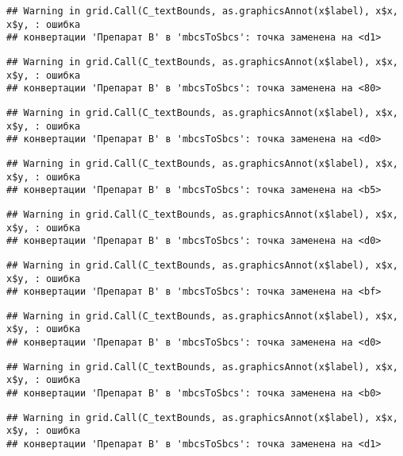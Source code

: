 \documentclass[
]{article}
\begin{document}
\begin{verbatim}
## Warning in grid.Call(C_textBounds, as.graphicsAnnot(x$label), x$x, x$y, : ошибка
## конвертации 'Препарат B' в 'mbcsToSbcs': точка заменена на <d1>
\end{verbatim}

\begin{verbatim}
## Warning in grid.Call(C_textBounds, as.graphicsAnnot(x$label), x$x, x$y, : ошибка
## конвертации 'Препарат B' в 'mbcsToSbcs': точка заменена на <80>
\end{verbatim}

\begin{verbatim}
## Warning in grid.Call(C_textBounds, as.graphicsAnnot(x$label), x$x, x$y, : ошибка
## конвертации 'Препарат B' в 'mbcsToSbcs': точка заменена на <d0>
\end{verbatim}

\begin{verbatim}
## Warning in grid.Call(C_textBounds, as.graphicsAnnot(x$label), x$x, x$y, : ошибка
## конвертации 'Препарат B' в 'mbcsToSbcs': точка заменена на <b5>
\end{verbatim}

\begin{verbatim}
## Warning in grid.Call(C_textBounds, as.graphicsAnnot(x$label), x$x, x$y, : ошибка
## конвертации 'Препарат B' в 'mbcsToSbcs': точка заменена на <d0>
\end{verbatim}

\begin{verbatim}
## Warning in grid.Call(C_textBounds, as.graphicsAnnot(x$label), x$x, x$y, : ошибка
## конвертации 'Препарат B' в 'mbcsToSbcs': точка заменена на <bf>
\end{verbatim}

\begin{verbatim}
## Warning in grid.Call(C_textBounds, as.graphicsAnnot(x$label), x$x, x$y, : ошибка
## конвертации 'Препарат B' в 'mbcsToSbcs': точка заменена на <d0>
\end{verbatim}

\begin{verbatim}
## Warning in grid.Call(C_textBounds, as.graphicsAnnot(x$label), x$x, x$y, : ошибка
## конвертации 'Препарат B' в 'mbcsToSbcs': точка заменена на <b0>
\end{verbatim}

\begin{verbatim}
## Warning in grid.Call(C_textBounds, as.graphicsAnnot(x$label), x$x, x$y, : ошибка
## конвертации 'Препарат B' в 'mbcsToSbcs': точка заменена на <d1>
\end{verbatim}
\end{document}
